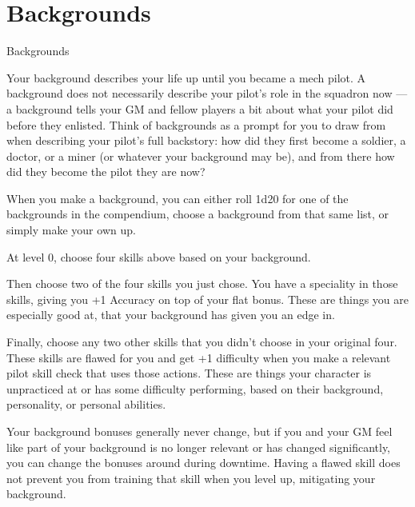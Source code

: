 \section{Backgrounds}
                                               Backgrounds

Your background describes your life up until you became a mech pilot. A background does not
necessarily describe your pilot’s role in the squadron now — a background tells your GM and
fellow players a bit about what your pilot did before they enlisted. Think of backgrounds as a
prompt for you to draw from when describing your pilot’s full backstory: how did they first
become a soldier, a doctor, or a miner (or whatever your background may be), and from there
how did they become the pilot they are now?


When you make a background, you can either roll 1d20 for one of the backgrounds in the
compendium, choose a background from that same list, or simply make your own up.


At level 0, choose four skills above based on your background.

Then choose two of the four skills you just chose. You have a speciality in those skills, giving
you +1 Accuracy on top of your flat bonus. These are things you are especially good at, that
your background has given you an edge in.





Finally, choose any two other skills that you didn’t choose in your original four. These skills are
flawed for you and get +1 difficulty when you make a relevant pilot skill check that uses those
actions. These are things your character is unpracticed at or has some difficulty performing,
based on their background, personality, or personal abilities.


Your background bonuses generally never change, but if you and your GM feel like part of your
background is no longer relevant or has changed significantly, you can change the bonuses
around during downtime. Having a flawed skill does not prevent you from training that skill when
you level up, mitigating your background.